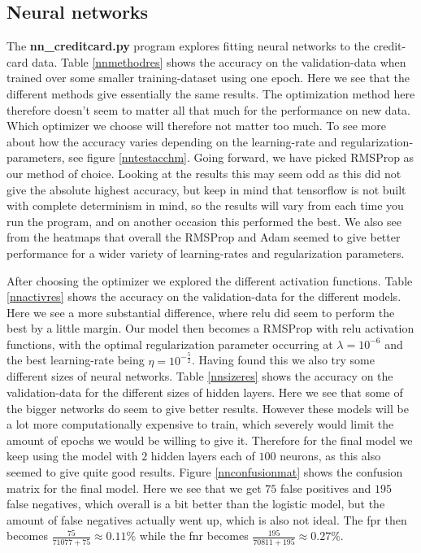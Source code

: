 \documentclass{article}
\begin{document}
\subsection{Neural networks}
The \textbf{nn\_creditcard.py} program explores fitting neural networks to the
credit-card data. Table \ref{nnmethodres} shows the accuracy on the
validation-data when trained over some smaller training-dataset using one
epoch. Here we see that the different methods give essentially the same results.
The optimization method here therefore doesn't seem to matter all that much for
the performance on new data. Which optimizer we choose will therefore not matter
too much. To see more about how the accuracy varies depending on the
learning-rate and regularization-parameters, see figure \ref{nntestacchm}. Going
forward, we have picked RMSProp as our method of choice.  Looking at the results
this may seem odd as this did not give the absolute highest accuracy, but keep in
mind that tensorflow is not built with complete determinism in mind, so the
results will vary from each time you run the program, and on another occasion
this performed the best. We also see from the heatmaps that overall the RMSProp
and Adam seemed to give better performance for a wider variety of learning-rates
and regularization parameters.

After choosing the optimizer we explored the different activation functions. Table
\ref{nnactivres} shows the accuracy on the validation-data for the different models.
Here we see a more substantial difference, where relu did seem to perform the
best by a little margin. Our model then becomes a RMSProp with relu activation
functions, with the optimal regularization parameter occurring at $\lambda =
	10^{-6}$ and the best learning-rate being $\eta = 10^{-\frac{5}{2}}$. Having
found this we also try some different sizes of neural networks. Table
\ref{nnsizeres} shows the accuracy on the validation-data for the different sizes of
hidden layers. Here we see that some of the bigger networks do seem to give
better results. However these models will be a lot more computationally
expensive to train, which severely would limit the amount of epochs we would be
willing to give it. Therefore for the final model we keep using the model with
$2$ hidden layers each of $100$ neurons, as this also seemed to give quite good
results. Figure \ref{nnconfusionmat} shows the confusion matrix for the final
model.  Here we see that we get $75$ false positives and $195$ false negatives,
which overall is a bit better than the logistic model, but the amount of false
negatives actually went up, which is also not ideal. The fpr then becomes
$\frac{75}{71077+75} \approx 0.11\%$ while the fnr becomes
$\frac{195}{70811+195} \approx 0.27\%$.
\end{document}
